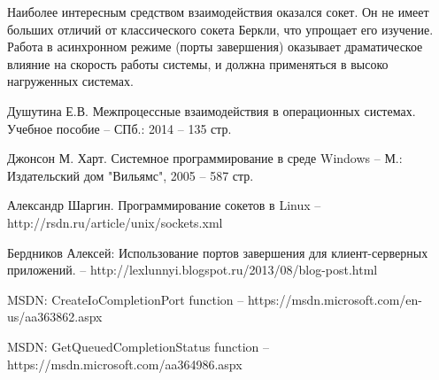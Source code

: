 \documentclass[a4paper, 12pt]{report}		%
\begin{document}
\vspace{1em}

Наиболее интересным средством взаимодействия оказался сокет. Он не имеет больших отличий от классического сокета Беркли, что упрощает его изучение. Работа в асинхронном режиме (порты завершения) оказывает драматическое влияние на скорость работы системы, и должна применяться в высоко нагруженных системах.

\newpage


\begin{thebibliography}{00}

Душутина Е.В. Межпроцессные взаимодействия в операционных системах. Учебное пособие -- СПб.: 2014 -- 135 стр.

Джонсон М. Харт. Системное программирование в среде Windows -- М.: Издательский дом "Вильямс", 2005 -- 587 стр.

Александр Шаргин. Программирование сокетов в Linux -- http://rsdn.ru/article/unix/sockets.xml

Бердников Алексей: Использование портов завершения для клиент-серверных приложений. -- http://lexlunnyi.blogspot.ru/2013/08/blog-post.html

MSDN: CreateIoCompletionPort function -- https://msdn.microsoft.com/en-us/aa363862.aspx

MSDN: GetQueuedCompletionStatus function -- https://msdn.microsoft.com/aa364986.aspx

\end{thebibliography}
\end{document}
